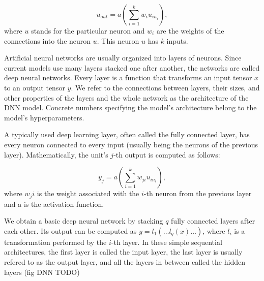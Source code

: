 \begin{equation}
u_{out} = a \left( \sum_{i=1}^k w_i u_{in_i} \right),
\end{equation}
where $u$ stands for the particular neuron and $w_i$ are the weights of the connections into the neuron $u$. This neuron $u$ has $k$ inputs.

Artificial neural networks are usually organized into layers of neurons. Since current models use many layers stacked one after another, the networks are called deep neural networks. Every layer is a function that transforms an input tensor $x$ to an output tensor $y$. We refer to the connections between layers, their sizes, and other properties of the layers and the whole network as the architecture of the DNN model. Concrete numbers specifying the model’s architecture belong to the model’s hyperparameters. 

A typically used deep learning layer, often called the fully connected layer, has every neuron connected to every input (usually being the neurons of the previous layer). Mathematically, the unit’s $j$-th output is computed as follows: 

\begin{equation}
y_j = a\left(\sum_{i=1}^k w_{ji} u_{in_i}\right),
\end{equation}
where $w_ji$ is the weight associated with the $i$-th neuron from the previous layer and a is the activation function.

We obtain a basic deep neural network by stacking $q$ fully connected layers after each other. Its output can be computed as $y = l_1(\dots l_q(x) \dots)$, where $l_i$ is a transformation performed by the $i$-th layer. In these simple sequential architectures, the first layer is called the input layer, the last layer is usually refered to as the output layer, and all the layers in between called the hidden layers (fig DNN TODO)






